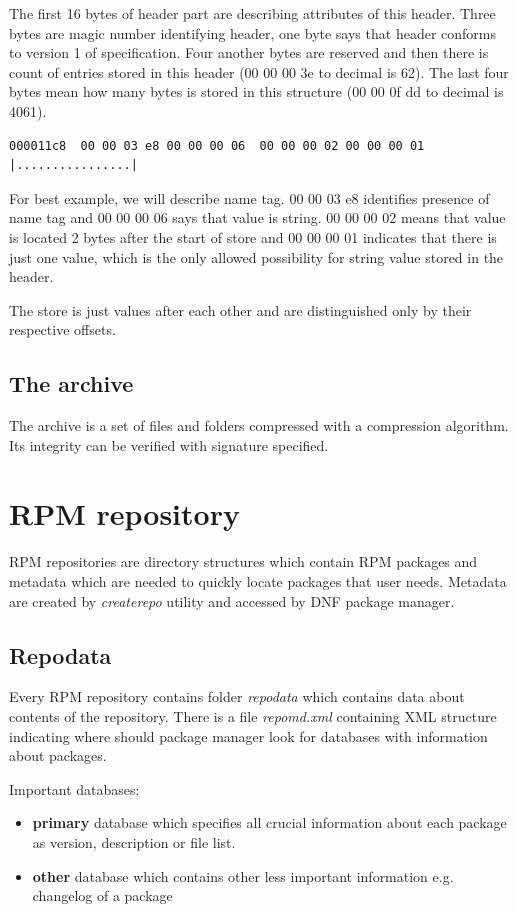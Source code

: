 The first 16 bytes of header part are describing attributes of this header. Three bytes are
magic number identifying header, one byte says that header conforms to version 1 of specification.
Four another bytes are reserved and then there is count of entries stored in this header
(00 00 00 3e to decimal is 62). The last four bytes mean how many bytes is stored in this structure
(00 00 0f dd to decimal is 4061).

\begin{lstlisting}
000011c8  00 00 03 e8 00 00 00 06  00 00 00 02 00 00 00 01  |................|
\end{lstlisting}

For best example, we will describe name tag. 00 00 03 e8 identifies presence of
name tag and 00 00 00 06 says that value is string. 00 00 00 02 means that value
is located 2 bytes after the start of store and 00 00 00 01 indicates that there is
just one value, which is the only allowed possibility for string value stored in the header.

The store is just values after each other and are distinguished only by their respective offsets.

\subsection*{The archive}
The archive is a set of files and folders compressed with a compression algorithm. Its integrity
can be verified with signature specified.

\section{RPM repository}
RPM repositories are directory structures which contain RPM packages and metadata which are needed
to quickly locate packages that user needs. Metadata are created by \textit{createrepo} \cite{RPMRepository}
utility and accessed by DNF package manager. 

\subsection*{Repodata}
Every RPM repository contains folder \textit{repodata} which contains data about contents of the
repository. There is a file \textit{repomd.xml} containing XML structure indicating where should
package manager look for databases with information about packages.

Important databases:
\begin{itemize}
  \item \textbf{primary} database which specifies all crucial information about each package as version, description or file list.
  \item \textbf{other} database which contains other less important information e.g. changelog of a package
\end{itemize}


